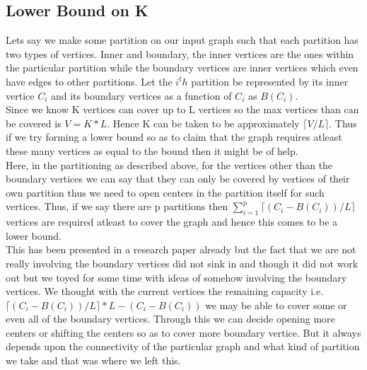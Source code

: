 \documentclass[12pt,a4paper,onecolumn]{article}
\begin{document}
\subsection{Lower Bound on K}
Lets say we make some partition on our input graph such that each partition has two types of vertices. Inner and boundary, the inner vertices are the ones within the particular partition while the boundary vertices are inner vertices which even have edges to other partitions. Let the $i^th$ partition be represented by its inner vertice $C_i$ and its boundary vertices as a function of $C_i$ as $B(C_i)$.\\
Since we know K vertices can cover up to L vertices so the max vertices than can be covered is $V = K*L$. Hence K can be taken to be approximately $\lceil V/L\rceil$. Thus if we try forming a lower bound so as to claim that the graph requires atleast these many vertices as equal to the bound then it might be of help. \\Here, in the partitioning as described above, for the vertices other than the boundary vertices we can say that they can only be covered by vertices of their own partition thus we need to open centers in the partition itself for such vertices. Thus, if we say there are p partitions then $\sum_{i=1}^{p}\lceil (C_i-B(C_i))/L\rceil$ vertices are required atleast to cover the graph and hence this comes to be a lower bound. 
\\ This has been presented in a research paper already but the fact that we are not really involving the boundary vertices did not sink in and though it did not work out but we toyed for some time with ideas of somehow involving the boundary vertices. We thought with the current vertices the remaining capacity i.e. $\lceil (C_i-B(C_i))/L\rceil*L-(C_i-B(C_i))$ we may be able to cover some or even all of the boundary vertices. Through this we can decide opening more centers or shifting the centers so as to cover more boundary vertice. But it always depends upon the connectivity of the particular graph and what kind of partition we take and that was where we left this.
\end{document}
